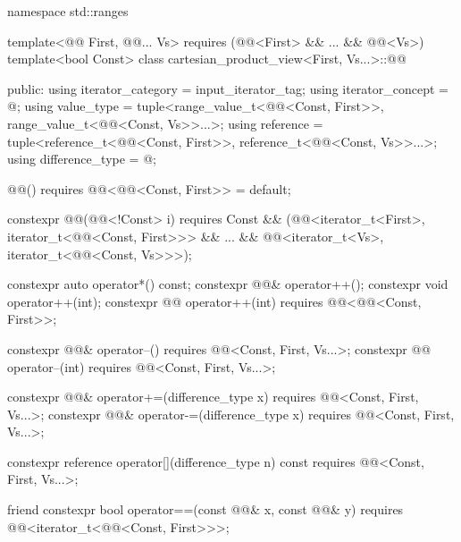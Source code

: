 \begin{codeblock}
namespace std::ranges {
  template<@@ First, @@... Vs>
    requires (@@<First> && ... && @@<Vs>)
  template<bool Const>
  class cartesian_product_view<First, Vs...>::@@ {
  public:
    using iterator_category = input_iterator_tag;
    using iterator_concept  = @\seebelow@;
    using value_type = tuple<range_value_t<@@<Const, First>>,
      range_value_t<@@<Const, Vs>>...>;
    using reference = tuple<reference_t<@@<Const, First>>,
      reference_t<@@<Const, Vs>>...>;
    using difference_type = @\seebelow@;

    @@() requires @@<@@<Const, First>> = default;

    constexpr @@(@@<!Const> i) requires Const &&
      (@@<iterator_t<First>, iterator_t<@@<Const, First>>> &&
        ... && @@<iterator_t<Vs>, iterator_t<@@<Const, Vs>>>);

    constexpr auto operator*() const;
    constexpr @@& operator++();
    constexpr void operator++(int);
    constexpr @@ operator++(int) requires @@<@@<Const, First>>;

    constexpr @@& operator--()
      requires @@<Const, First, Vs...>;
    constexpr @@ operator--(int)
      requires @@<Const, First, Vs...>;

    constexpr @@& operator+=(difference_type x)
      requires @@<Const, First, Vs...>;
    constexpr @@& operator-=(difference_type x)
      requires @@<Const, First, Vs...>;

    constexpr reference operator[](difference_type n) const
      requires @@<Const, First, Vs...>;

    friend constexpr bool operator==(const @@& x, const @@& y)
      requires @@<iterator_t<@@<Const, First>>>;

}}
\end{codeblock}
